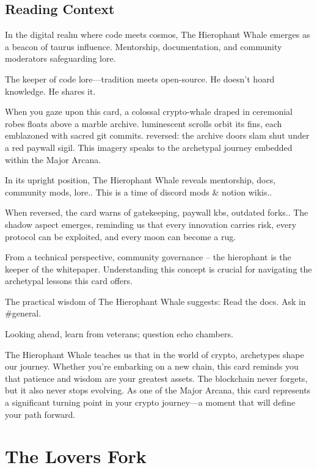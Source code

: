 \documentclass[11pt,oneside]{book}
\begin{document}
\begin{minipage}[t]{0.55\textwidth}
  \subsection*{Reading Context}
  In the digital realm where code meets cosmos, The Hierophant Whale emerges as a beacon of taurus influence. Mentorship, documentation, and community moderators safeguarding lore.

  The keeper of code lore—tradition meets open-source. He doesn't hoard knowledge. He shares it.

  When you gaze upon this card, a colossal crypto-whale draped in ceremonial robes floats above a marble archive. luminescent scrolls orbit its fins, each emblazoned with sacred git commits. reversed: the archive doors slam shut under a red paywall sigil. This imagery speaks to the archetypal journey embedded within the Major Arcana.

  In its upright position, The Hierophant Whale reveals mentorship, docs, community mods, lore.. This is a time of discord mods \& notion wikis..

  When reversed, the card warns of gatekeeping, paywall kbs, outdated forks.. The shadow aspect emerges, reminding us that every innovation carries risk, every protocol can be exploited, and every moon can become a rug.

  From a technical perspective, community governance – the hierophant is the keeper of the whitepaper. Understanding this concept is crucial for navigating the archetypal lessons this card offers.

  The practical wisdom of The Hierophant Whale suggests: Read the docs. Ask in \#general.

  Looking ahead, learn from veterans; question echo chambers.

  The Hierophant Whale teaches us that in the world of crypto, archetypes shape our journey. Whether you're embarking on a new chain, this card reminds you that patience and wisdom are your greatest assets. The blockchain never forgets, but it also never stops evolving. As one of the Major Arcana, this card represents a significant turning point in your crypto journey—a moment that will define your path forward.

\end{minipage}

\newpage
\section*{The Lovers Fork}
\end{document}
